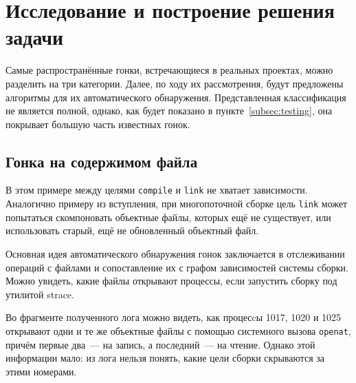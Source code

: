 \section{Исследование и построение решения задачи}
\label{sec:Chapter3} 


Самые распространённые гонки, встречающиеся в реальных проектах, можно разделить на три категории. Далее, по ходу их рассмотрения, будут предложены алгоритмы для их автоматического обнаружения. Представленная классификация не является полной, однако, как будет показано в пункте~\ref{subsec:testing}, она покрывает большую часть известных гонок.

\subsection{Гонка на содержимом файла}
\label{subsec:file-content-races}



В этом примере между целями \texttt{compile} и \texttt{link} не хватает зависимости. Аналогично примеру из вступления, при многопоточной сборке цель \texttt{link} может попытаться скомпоновать объектные файлы, которых ещё не существует, или использовать старый, ещё не обновленный объектный файл.

Основная идея автоматического обнаружения гонок заключается в отслеживании операций с файлами и сопоставление их с графом зависимостей системы сборки. Можно увидеть, какие файлы открывают процессы, если запустить сборку под утилитой strace.



Во фрагменте полученного лога можно видеть, как процесcы 1017, 1020 и 1025 открывают одни и те же объектные файлы с помощью системного вызова \texttt{openat}, причём первые два~--- на запись, а последний~--- на чтение. Однако этой информации мало: из лога нельзя понять, какие цели сборки скрываются за этими номерами.

